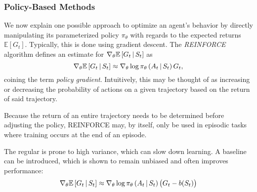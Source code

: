 \subsubsection{Policy-Based Methods}
We now explain one possible approach to optimize an agent's behavior by directly manipulating its parameterized policy $\pi_\theta$ with regards to the expected returns $\mathbb{E}\left[G_t\right]$. Typically, this is done using gradient descent. The \textit{REINFORCE} algorithm \cite{reinforce} defines an estimate for $\nabla_\theta \mathbb{E}\left[G_t \,\middle|\, S_t \right]$ as
\begin{equation*}
    \nabla_\theta \mathbb{E}\left[G_t \,\middle|\, S_t \right] \approx \nabla_\theta \log \pi_\theta\left(A_t \,\middle|\, S_t\right) G_t,
\end{equation*}
coining the term \textit{policy gradient}. Intuitively, this may be thought of as increasing or decreasing the probability of actions on a given trajectory based on the return of said trajectory.

Because the return of an entire trajectory needs to be determined before adjusting the policy, REINFORCE may, by itself, only be used in episodic tasks where training occurs at the end of an episode.

The regular is prone to high variance, which can slow down learning. A baseline can be introduced, which is shown to remain unbiased and often improves performance:
\begin{equation*}
    \nabla_\theta \mathbb{E}\left[G_t \,\middle|\, S_t \right] \approx \nabla_\theta \log \pi_\theta\left(A_t \,\middle|\, S_t\right) \left(G_t - b(S_t)\right)
\end{equation*}